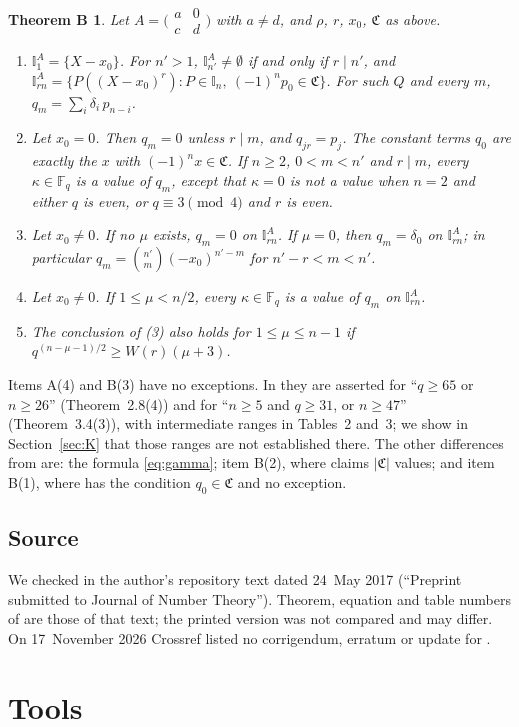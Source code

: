 \documentclass[11pt,a4paper]{amsart}
\newtheorem*{theoremB}{Theorem B}
\theoremstyle{remark}
\newcommand{\Fq}{\mathbb{F}_q}
\newcommand{\I}{\mathbb{I}}
\newcommand{\fC}{\mathfrak{C}}
\newcommand{\mat}[4]{\bigl(\begin{smallmatrix}#1&#2\\#3&#4\end{smallmatrix}\bigr)}
\begin{document}
\begin{theoremB}
Let $A=\mat a0cd$ with $a\ne d$, and $\rho$, $r$, $x_0$, $\fC$ as above.
\begin{enumerate}
\item[(0)] $\I^A_1=\{X-x_0\}$. For $n'>1$, $\I^A_{n'}\ne\emptyset$ if and only if $r\mid n'$, and
$\I^A_{rn}=\{P((X-x_0)^r):P\in\I_n,\ (-1)^np_0\in\fC\}$. For such $Q$ and every $m$,
$q_m=\sum_i\delta_i\,p_{n-i}$.
\item[(1)] Let $x_0=0$. Then $q_m=0$ unless $r\mid m$, and $q_{jr}=p_j$. The constant terms $q_0$ are exactly
the $x$ with $(-1)^nx\in\fC$. If $n\ge2$, $0<m<n'$ and $r\mid m$, every $\kappa\in\Fq$ is a value of $q_m$, except
that $\kappa=0$ is not a value when $n=2$ and either $q$ is even, or $q\equiv3\pmod4$ and $r$ is even.
\item[(2)] Let $x_0\ne0$. If no $\mu$ exists, $q_m=0$ on $\I^A_{rn}$. If $\mu=0$, then $q_m=\delta_0$ on
$\I^A_{rn}$; in particular $q_m=\binom{n'}{m}(-x_0)^{n'-m}$ for $n'-r<m<n'$.
\item[(3)] Let $x_0\ne0$. If $1\le\mu<n/2$, every $\kappa\in\Fq$ is a value of $q_m$ on $\I^A_{rn}$.
\item[(4)] The conclusion of (3) also holds for $1\le\mu\le n-1$ if $q^{(n-\mu-1)/2}\ge W(r)(\mu+3)$.
\end{enumerate}
\end{theoremB}

Items A(4) and B(3) have no exceptions. In \cite{K} they are asserted for ``$q\ge65$ or $n\ge26$''
(Theorem~2.8(4)) and for ``$n\ge5$ and $q\ge31$, or $n\ge47$'' (Theorem~3.4(3)), with intermediate ranges
in Tables~2 and~3; we show in Section~\ref{sec:K} that those ranges are not established there. The other
differences from \cite{K} are: the formula \eqref{eq:gamma}; item B(2), where \cite{K} claims $|\fC|$ values;
and item B(1), where \cite{K} has the condition $q_0\in\fC$ and no exception.

\subsection{Source}
We checked \cite{K} in the author's repository text dated 24~May 2017 (``Preprint submitted to Journal of
Number Theory''). Theorem, equation and table numbers of \cite{K} are those of that text; the printed version
was not compared and may differ. On 17~November 2026 Crossref listed no corrigendum, erratum or update for
\cite{K}.

\section{Tools}\label{sec:tools}
\end{document}
